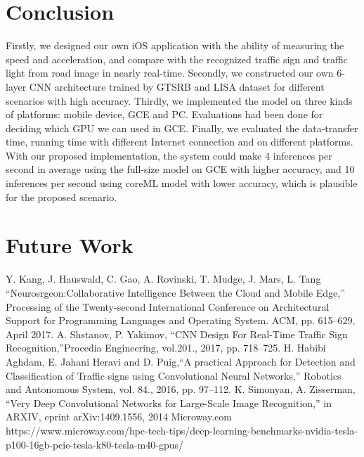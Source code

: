 \documentclass[conference]{IEEEtran}
\begin{document}
\section{Conclusion}
Firstly, we designed our own iOS application with the ability of measuring the speed and acceleration, and compare with the recognized traffic sign and traffic light from road image in nearly real-time. Secondly, we constructed our own 6-layer CNN architecture trained by GTSRB and LISA dataset for different scenarios with high accuracy. Thirdly, we implemented the model on three kinds of platforms: mobile device, GCE and PC. Evaluations had been done for deciding which GPU we can used in GCE. Finally, we evaluated the data-transfer time, running time with different Internet connection and on different platforms. With our proposed implementation, the system could make 4 inferences per second in average using the full-size model on GCE with higher accuracy, and 10 inferences per second using coreML model with lower accuracy, which is plausible for the proposed scenario.

\section{Future Work}

\begin{thebibliography}{00}
 Y. Kang, J. Hauswald, C. Gao, A. Rovinski, T. Mudge, J. Mars, L. Tang ``Neurosrgeon:Collaborative Intelligence Between the Cloud and Mobile Edge,'' Processing of the Twenty-second International Conference on Architectural Support for Programming Languages and Operating System. ACM, pp. 615--629, April 2017.
 A. Shstanov, P. Yakimov, ``CNN Design For Real-Time Traffic Sign Recognition,''Procedia Engineering, vol.201., 2017, pp. 718--725.
 H. Habibi Aghdam, E. Jahani Heravi and D. Puig,``A practical Approach for Detection and Classification of Traffic signs using Convolutional Neural Networks,'' Robotics and Autonomous System, vol. 84., 2016, pp. 97--112.
 K. Simonyan, A. Zisserman, ``Very Deep Convolutional Networks for Large-Scale Image Recognition,'' in ARXIV, eprint arXiv:1409.1556, 2014
 Microway.com https://www.microway.com/hpc-tech-tips/deep-learning-benchmarks-nvidia-tesla-p100-16gb-pcie-tesla-k80-tesla-m40-gpus/
\end{thebibliography}
\end{document}
